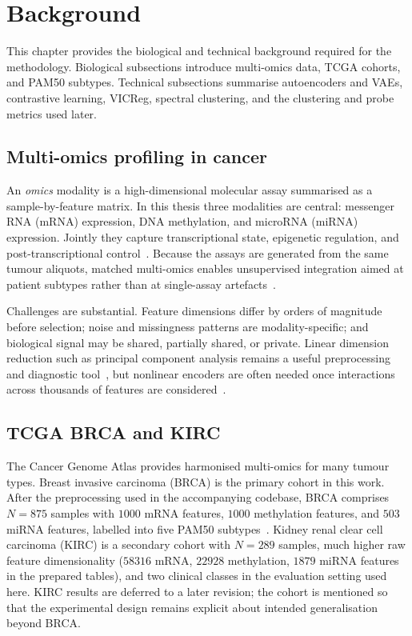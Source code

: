 \clearpage
\section{Background}
\label{sec:background}

This chapter provides the biological and technical background required for the methodology. Biological subsections introduce multi-omics data, TCGA cohorts, and PAM50 subtypes. Technical subsections summarise autoencoders and VAEs, contrastive learning, VICReg, spectral clustering, and the clustering and probe metrics used later.

\subsection{Multi-omics profiling in cancer}

An \emph{omics} modality is a high-dimensional molecular assay summarised as a sample-by-feature matrix. In this thesis three modalities are central: messenger RNA (mRNA) expression, DNA methylation, and microRNA (miRNA) expression. Jointly they capture transcriptional state, epigenetic regulation, and post-transcriptional control~\citep{hasin2017multi}. Because the assays are generated from the same tumour aliquots, matched multi-omics enables unsupervised integration aimed at patient subtypes rather than at single-assay artefacts~\citep{jiang2022big,mohr2024navigating}.

Challenges are substantial. Feature dimensions differ by orders of magnitude before selection; noise and missingness patterns are modality-specific; and biological signal may be shared, partially shared, or private. Linear dimension reduction such as principal component analysis remains a useful preprocessing and diagnostic tool~\citep{yeung2001principal}, but nonlinear encoders are often needed once interactions across thousands of features are considered~\citep{Goodfellow-et-al-2016}.

\subsection{TCGA BRCA and KIRC}

The Cancer Genome Atlas provides harmonised multi-omics for many tumour types. Breast invasive carcinoma (BRCA) is the primary cohort in this work. After the preprocessing used in the accompanying codebase, BRCA comprises $N=875$ samples with $1000$ mRNA features, $1000$ methylation features, and $503$ miRNA features, labelled into five PAM50 subtypes~\citep{parker2009pam50}. Kidney renal clear cell carcinoma (KIRC) is a secondary cohort with $N=289$ samples, much higher raw feature dimensionality ($58316$ mRNA, $22928$ methylation, $1879$ miRNA features in the prepared tables), and two clinical classes in the evaluation setting used here. KIRC results are deferred to a later revision; the cohort is mentioned so that the experimental design remains explicit about intended generalisation beyond BRCA.

